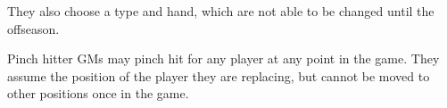 \begin{deepEnumerate}
\begin{deepEnumerate}
\begin{deepEnumerate}
\begin{deepEnumerate}
\begin{deepEnumerate}
                                                      \item They also choose a type and hand,
                                                            which are not able to be changed until the offseason.
                                                      \item Pinch hitter GMs may pinch hit for any player at any point in the game.
                                                            They assume the position of the player they are replacing,
                                                            but cannot be moved to other positions once in the game.
                                                \end{deepEnumerate}
                                    \end{deepEnumerate}
                        \end{deepEnumerate}
          \end{deepEnumerate}
\end{deepEnumerate}

